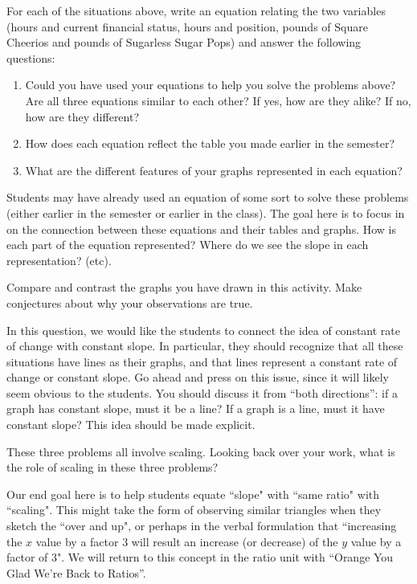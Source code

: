 \documentclass{ximera}
\begin{document}
\begin{problem}
For each of the situations above, write an equation relating the two
variables (hours and current financial status, hours and position, 
pounds of Square Cheerios and pounds of Sugarless Sugar Pops) and
answer the following questions:
\begin{enumerate}
\item Could you have used your equations to help you solve the problems
  above? Are all three equations similar to each other? If yes, how are they alike?  If no, how are they different?
   \item How does each equation reflect the table you made earlier in the semester?
  \item  What are the different features of your graphs represented in each equation?
 \end{enumerate}
 
 \begin{instructorNotes}
 Students may have already used an equation of some sort to solve these problems (either earlier in the semester or earlier in the class).  The goal here is to focus in on the connection between these equations and their tables and graphs.  How is each part of the equation represented?  Where do we see the slope in each representation?  (etc).
 \end{instructorNotes}
\end{problem}

\begin{problem}
Compare and contrast the graphs you have drawn in this activity.  Make conjectures about why your observations are true.
\begin{instructorNotes}
In this question, we would like the students to connect the idea of constant rate of change with constant slope.  In particular, they should recognize that all these situations have lines as their graphs, and that lines represent a constant rate of change or constant slope.  Go ahead and press on this issue, since it will likely seem obvious to the students.  You should discuss it from ``both directions'': if a graph has constant slope, must it be a line?  If a graph is a line, must it have constant slope?  This idea should be made explicit.
\end{instructorNotes}
\end{problem}

\begin{problem}
These three problems all involve scaling.  Looking back over your work, what is the role of scaling in these three problems?

\begin{instructorNotes}
Our end goal here is to help students equate ``slope" with ``same ratio" with ``scaling".  This might take the form of observing similar triangles when they sketch the ``over and up", or perhaps in the verbal formulation that ``increasing the $x$ value by a factor 3 will result an increase (or decrease) of the $y$ value by a factor of 3". We will return to this concept in the ratio unit with ``Orange You Glad We're Back to Ratios''.
\end{instructorNotes}
\end{problem}
\end{document}
